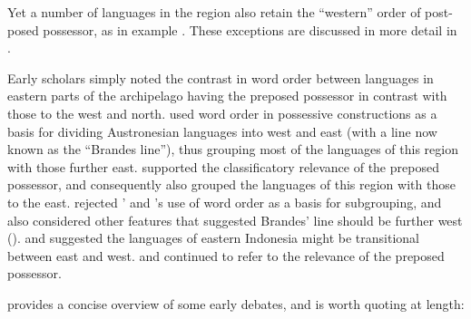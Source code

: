 Yet a number of languages in the region also retain the “western”
order of post-posed possessor, as in example .
These exceptions are discussed in more detail in .

\begin{exe}
	\label{ex:01-04}
	\sn{\gll	{} kətu {} {} {\j}ohani {}\\
						[ head \bracr{\sub{POSSESSED}} [ John \bracr{\sub{POSSESSOR}}\\
			\glt	`John's head'}
\end{exe}

Early scholars simply noted the contrast in word order between languages
in eastern parts of the archipelago having the preposed possessor in contrast
with those to the west and north.
\citet{Brandes1884} used word order in possessive constructions
as a basis for dividing Austronesian languages into west
and east (with a line now known as the “Brandes line”),
thus grouping most of the languages of this region with those further east.
\citet{Friederici1913} supported the classificatory relevance of the preposed possessor,
and consequently also grouped the languages of this region with those to the east.
\citet{Jonker1914} rejected \citeauthor{Brandes1884}’
and \citeauthor{Friederici1913}’s use of word order as a basis for subgrouping,
and also considered other features that suggested Brandes’
line should be further west (\citeyear[367]{Jonker1914}).
\citet{Kern1906} and \citet{KanskiKasprusch1931} suggested the languages of
eastern Indonesia might be transitional between east and west.
\citet{Cowan1951} and \citet{Cappell1976}
continued to refer to the relevance of the preposed possessor.

\citet[235f]{Dyen1978b} provides a concise overview of
some early debates, and is worth quoting at length:

